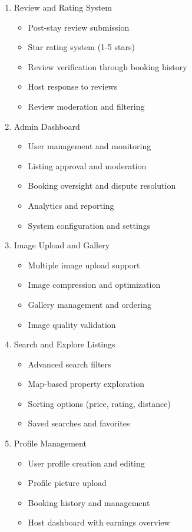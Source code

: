 \documentclass[12pt,a4paper]{report}
\begin{document}
\begin{enumerate}
    \item Review and Rating System
    \begin{itemize}
        \item Post-stay review submission
        \item Star rating system (1-5 stars)
        \item Review verification through booking history
        \item Host response to reviews
        \item Review moderation and filtering
    \end{itemize}
    
    \item Admin Dashboard
    \begin{itemize}
        \item User management and monitoring
        \item Listing approval and moderation
        \item Booking oversight and dispute resolution
        \item Analytics and reporting
        \item System configuration and settings
    \end{itemize}
    
    \item Image Upload and Gallery
    \begin{itemize}
        \item Multiple image upload support
        \item Image compression and optimization
        \item Gallery management and ordering
        \item Image quality validation
    \end{itemize}
    
    \item Search and Explore Listings
    \begin{itemize}
        \item Advanced search filters
        \item Map-based property exploration
        \item Sorting options (price, rating, distance)
        \item Saved searches and favorites
    \end{itemize}
    
    \item Profile Management
    \begin{itemize}
        \item User profile creation and editing
        \item Profile picture upload
        \item Booking history and management
        \item Host dashboard with earnings overview
    \end{itemize}
    

\end{enumerate}
\end{document}
